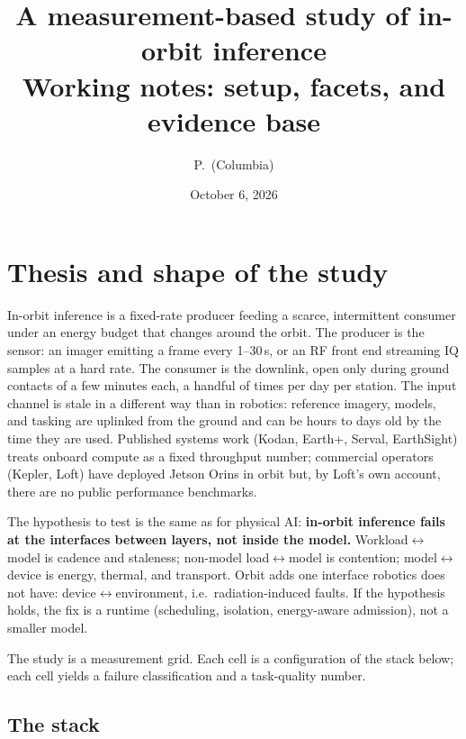 \documentclass[11pt]{article}
\title{A measurement-based study of in-orbit inference\\[2pt]
\large Working notes: setup, facets, and evidence base}
\author{P.\ (Columbia)}
\date{October 6, 2026}
\begin{document}
\maketitle

\section{Thesis and shape of the study}

In-orbit inference is a fixed-rate producer feeding a scarce, intermittent consumer under an energy budget
that changes around the orbit. The producer is the sensor: an imager emitting a frame every 1--30\,s, or
an RF front end streaming IQ samples at a hard rate. The consumer is the downlink, open only during
ground contacts of a few minutes each, a handful of times per day per station. The input channel is stale
in a different way than in robotics: reference imagery, models, and tasking are uplinked from the ground
and can be hours to days old by the time they are used. Published systems work (Kodan, Earth+, Serval,
EarthSight) treats onboard compute as a fixed throughput number; commercial operators (Kepler, Loft)
have deployed Jetson Orins in orbit but, by Loft's own account, there are no public performance
benchmarks.

The hypothesis to test is the same as for physical AI: \textbf{in-orbit inference fails at the interfaces
between layers, not inside the model.} Workload$\leftrightarrow$model is cadence and staleness;
non-model load$\leftrightarrow$model is contention; model$\leftrightarrow$device is energy, thermal,
and transport. Orbit adds one interface robotics does not have: device$\leftrightarrow$environment,
i.e.\ radiation-induced faults. If the hypothesis holds, the fix is a runtime (scheduling, isolation,
energy-aware admission), not a smaller model.

The study is a measurement grid. Each cell is a configuration of the stack below; each cell yields a
failure classification and a task-quality number.

\subsection{The stack}
\end{document}
